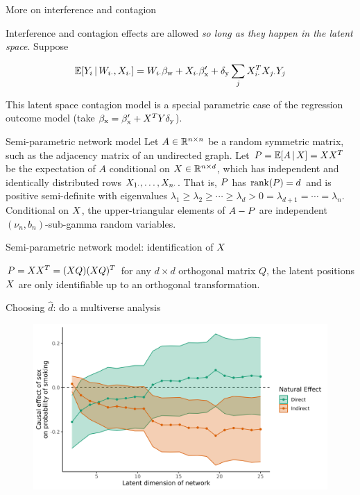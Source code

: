 \documentclass{beamer}
\theoremstyle{remark}
\begin{document}
\begin{frame}{More on interference and contagion}

    Interference and contagion effects are allowed \emph{so long as they happen in the latent space}. Suppose

    \begin{align*}
        \E[\W_{i \cdot}, \X_{i \cdot}]{Y_i}
        = \W_{i \cdot} \betaw + \X_{i \cdot} \beta'_\text{x} + \delta_\text{y} \sum_{j} \X_{i \cdot}^T \X_{j \cdot} Y_j
    \end{align*}

    This latent space contagion model is a special parametric case of the regression outcome model (take $\beta_\text{x} = \beta'_\text{x} + X^T Y \delta_\text{y}$).

\end{frame}

\begin{frame}{Semi-parametric network model}
    Let $A \in \mathbb{R}^{n \times n}$ be a random symmetric matrix, such as the adjacency matrix of an undirected graph. Let $\Apop = \E[\X]{A} = \X \X^T$ be the expectation of $A$ conditional on $X \in \mathbb{R}^{n \times d}$, which has independent and identically distributed rows $X_{1 \cdot}, \dots, X_{n \cdot}$. That is, $P$ has $\rank \paren*{\Apop} = d$ and is positive semi-definite with eigenvalues $\lambda_1 \ge \lambda_2 \ge \cdots \ge \lambda_d > 0 = \lambda_{d+1} = \cdots = \lambda_n$. Conditional on $X$, the upper-triangular elements of $A - P$ are independent $(\nu_n, b_n)$-sub-gamma random variables.
\end{frame}


\begin{frame}{Semi-parametric network model: identification of $X$}

    $P = X X^T = (X Q) (X Q)^T$ for any $d \times d$ orthogonal matrix $Q$, the latent positions $X$ are only identifiable up to an orthogonal transformation.
\end{frame}

\begin{frame}{Choosing $\widehat{d}$: do a multiverse analysis}

    \centering

    \begin{figure}
        \includegraphics[width=\textwidth]{figures/glasgow-effects.png}
    \end{figure}

\end{frame}
\end{document}
